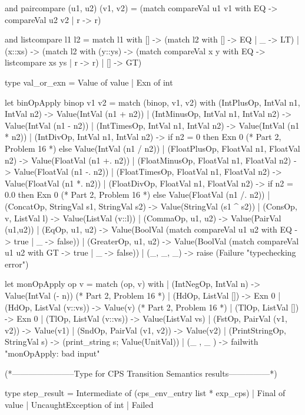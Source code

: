 and paircompare (u1, u2) (v1, v2) =
     (match compareVal u1 v1 with EQ -> compareVal u2 v2
      | r -> r)

and listcompare l1 l2 =
   match l1 with
     [] -> (match l2 with [] -> EQ | _ -> LT)
   | (x::xs) -> (match l2 with (y::ys) ->
                   (match compareVal x y with EQ -> listcompare xs ys
                     | r -> r)
                  | [] -> GT)

type val_or_exn = Value of value | Exn of int

let binOpApply binop v1 v2 =
  match (binop, v1, v2) with
    (IntPlusOp, IntVal n1, IntVal n2)      -> Value(IntVal (n1 + n2))
  | (IntMinusOp, IntVal n1, IntVal n2)     -> Value(IntVal (n1 - n2))
  | (IntTimesOp, IntVal n1, IntVal n2)     -> Value(IntVal (n1 * n2))
  | (IntDivOp, IntVal n1, IntVal n2)       -> 
    if n2 = 0 then Exn 0 (* Part 2, Problem 16 *) else Value(IntVal (n1 / n2))
  | (FloatPlusOp, FloatVal n1, FloatVal n2)   -> Value(FloatVal (n1 +. n2))
  | (FloatMinusOp, FloatVal n1, FloatVal n2)  -> Value(FloatVal (n1 -. n2))
  | (FloatTimesOp, FloatVal n1, FloatVal n2)  -> Value(FloatVal (n1 *. n2))
  | (FloatDivOp, FloatVal n1, FloatVal n2)    ->
    if n2 = 0.0 then Exn 0 (* Part 2, Problem 16 *) else Value(FloatVal (n1 /. n2))
  | (ConcatOp, StringVal s1, StringVal s2) -> Value(StringVal (s1 ^ s2))
  | (ConsOp, v, ListVal l)                 -> Value(ListVal (v::l))
  | (CommaOp, u1, u2)                      -> Value(PairVal (u1,u2))
  | (EqOp, u1, u2)                         -> Value(BoolVal (match compareVal u1 u2 with EQ -> true
                                                        | _ -> false))
  | (GreaterOp, u1, u2)                    -> Value(BoolVal (match compareVal u1 u2 with GT -> true
                                                        | _ -> false))
  | (_, _, _)                              -> raise (Failure "typechecking error")

let monOpApply op v =
  match (op, v) with
  | (IntNegOp, IntVal n)         -> Value(IntVal (- n))
 (* Part 2, Problem 16 *)
  | (HdOp, ListVal [])         -> Exn 0
  | (HdOp, ListVal (v::vs))    -> Value(v)
 (* Part 2, Problem 16 *)
  | (TlOp, ListVal [])         -> Exn 0
  | (TlOp, ListVal (v::vs))    -> Value(ListVal vs)
  | (FstOp, PairVal (v1, v2))  -> Value(v1)
  | (SndOp, PairVal (v1, v2))  -> Value(v2)
  | (PrintStringOp, StringVal s) -> (print_string s; Value(UnitVal))
  | (_ , _ )                   -> failwith "monOpApply: bad input"

(*-----------------------Type for CPS Transition Semantics results---------------*)

type step_result =
   Intermediate of (cps_env_entry list * exp_cps)
 | Final of value
 | UncaughtException of int
 | Failed
